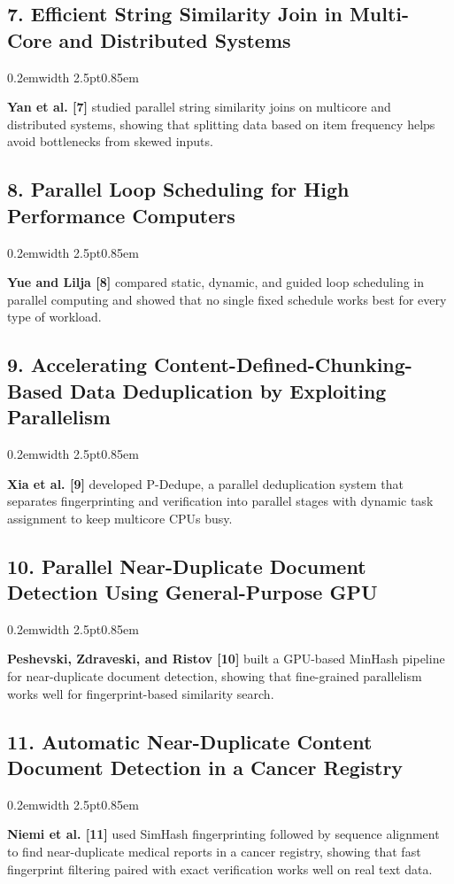 \documentclass[11pt,a4paper]{article}
\renewcommand{\_}{\textunderscore\allowbreak}
\newenvironment{litquote}{%
  \par\vspace{0.15em}%
  \noindent\kern0.2em\textcolor{quoteborder}{\vrule width 2.5pt}\kern0.85em%
  \begin{minipage}{\dimexpr\textwidth-1.3em\relax}%
  \itshape\color{black!88}%
}{%
  \end{minipage}\par\vspace{0.35em}%
}
\begin{document}
\subsection*{7. Efficient String Similarity Join in Multi-Core and Distributed Systems}
\begin{litquote}
\textbf{Yan et al. [7]} studied parallel string similarity joins on multicore and distributed systems, showing that splitting data based on item frequency helps avoid bottlenecks from skewed inputs.
\end{litquote}

\subsection*{8. Parallel Loop Scheduling for High Performance Computers}
\begin{litquote}
\textbf{Yue and Lilja [8]} compared static, dynamic, and guided loop scheduling in parallel computing and showed that no single fixed schedule works best for every type of workload.
\end{litquote}

\subsection*{9. Accelerating Content-Defined-Chunking-Based Data Deduplication by Exploiting Parallelism}
\begin{litquote}
\textbf{Xia et al. [9]} developed P-Dedupe, a parallel deduplication system that separates fingerprinting and verification into parallel stages with dynamic task assignment to keep multicore CPUs busy.
\end{litquote}

\subsection*{10. Parallel Near-Duplicate Document Detection Using General-Purpose GPU}
\begin{litquote}
\textbf{Peshevski, Zdraveski, and Ristov [10]} built a GPU-based MinHash pipeline for near-duplicate document detection, showing that fine-grained parallelism works well for fingerprint-based similarity search.
\end{litquote}

\subsection*{11. Automatic Near-Duplicate Content Document Detection in a Cancer Registry}
\begin{litquote}
\textbf{Niemi et al. [11]} used SimHash fingerprinting followed by sequence alignment to find near-duplicate medical reports in a cancer registry, showing that fast fingerprint filtering paired with exact verification works well on real text data.
\end{litquote}
\end{document}
